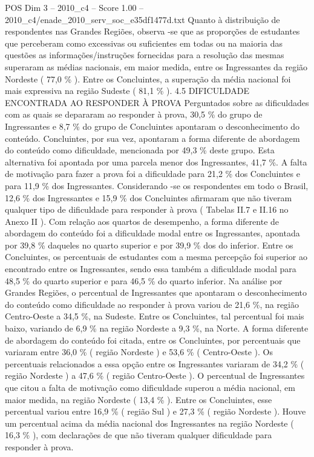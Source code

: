 \begin{textsample}{POS Dim 3 – 2010\_c4 – Score 1.00 – 2010\_c4/enade\_2010\_serv\_soc\_e35df1477d.txt}
Quanto à distribuição de respondentes nas Grandes Regiões, observa -se que as proporções de estudantes que perceberam como excessivas ou suficientes em todas ou na maioria das questões as informações/instruções fornecidas para a resolução das mesmas superaram as médias nacionais, em maior medida, entre os Ingressantes da região Nordeste ( 77,0 \% ).
Entre os Concluintes, a superação da média nacional foi mais expressiva na região Sudeste ( 81,1 \% ). 4.5 DIFICULDADE ENCONTRADA AO RESPONDER À PROVA Perguntados sobre as dificuldades com as quais se depararam ao responder à prova, 30,5 \% do grupo de Ingressantes e 8,7 \% do grupo de Concluintes apontaram o desconhecimento do conteúdo.
Concluintes, por sua vez, apontaram a forma diferente de abordagem do conteúdo como dificuldade, mencionada por 49,3 \% deste grupo.
Esta alternativa foi apontada por uma parcela menor dos Ingressantes, 41,7 \%.
A falta de motivação para fazer a prova foi a dificuldade para 21,2 \% dos Concluintes e para 11,9 \% dos Ingressantes.
Considerando -se os respondentes em todo o Brasil, 12,6 \% dos Ingressantes e 15,9 \% dos Concluintes afirmaram que não tiveram qualquer tipo de dificuldade para responder à prova ( Tabelas II.7 e II.16 no Anexo II ).
Com relação aos quartos de desempenho, a forma diferente de abordagem do conteúdo foi a dificuldade modal entre os Ingressantes, apontada por 39,8 \% daqueles no quarto superior e por 39,9 \% dos do inferior.
Entre os Concluintes, os percentuais de estudantes com a mesma percepção foi superior ao encontrado entre os Ingressantes, sendo essa também a dificuldade modal para 48,5 \% do quarto superior e para 46,5 \% do quarto inferior.
Na análise por Grandes Regiões, o percentual de Ingressantes que apontaram o desconhecimento do conteúdo como dificuldade ao responder à prova variou de 21,6 \%, na região Centro-Oeste a 34,5 \%, na Sudeste.
Entre os Concluintes, tal percentual foi mais baixo, variando de 6,9 \% na região Nordeste a 9,3 \%, na Norte.
A forma diferente de abordagem do conteúdo foi citada, entre os Concluintes, por percentuais que variaram entre 36,0 \% ( região Nordeste ) e 53,6 \% ( Centro-Oeste ).
Os percentuais relacionados a essa opção entre os Ingressantes variaram de 34,2 \% ( região Nordeste ) a 47,6 \% ( região Centro-Oeste ).
O percentual de Ingressantes que citou a falta de motivação como dificuldade superou a média nacional, em maior medida, na região Nordeste ( 13,4 \% ).
Entre os Concluintes, esse percentual variou entre 16,9 \% ( região Sul ) e 27,3 \% ( região Nordeste ).
Houve um percentual acima da média nacional dos Ingressantes na região Nordeste ( 16,3 \% ), com declarações de que não tiveram qualquer dificuldade para responder à prova.

\end{textsample}
